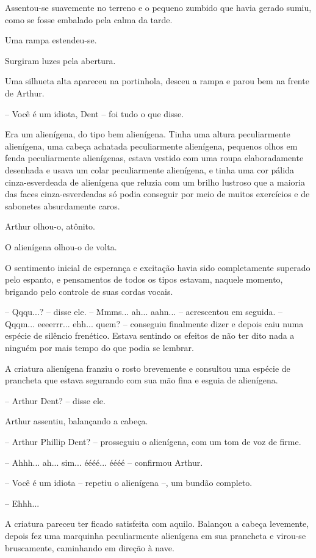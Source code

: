 \documentclass[eps,11pt]{book}
\begin{document}
Assentou-se suavemente no terreno e o pequeno zumbido que havia gerado sumiu, como se fosse embalado pela calma da tarde.

Uma rampa estendeu-se.

Surgiram luzes pela abertura.

Uma silhueta alta apareceu na portinhola, desceu a rampa e parou bem na frente de Arthur.

-- Você é um idiota, Dent -- foi tudo o que disse.

Era um alienígena, do tipo bem alienígena. Tinha uma altura peculiarmente alienígena, uma cabeça achatada peculiarmente alienígena, pequenos olhos em fenda peculiarmente alienígenas, estava vestido com uma roupa elaboradamente desenhada e usava um colar peculiarmente alienígena, e tinha uma cor pálida cinza-esverdeada de alienígena que reluzia com um brilho lustroso que a maioria das faces cinza-esverdeadas só podia conseguir por meio de muitos exercícios e de sabonetes absurdamente caros.

Arthur olhou-o, atônito.

O alienígena olhou-o de volta.

O sentimento inicial de esperança e excitação havia sido completamente superado pelo espanto, e pensamentos de todos os tipos estavam, naquele momento, brigando pelo controle de suas cordas vocais.

-- Qqqu...? -- disse ele. -- Mmms... ah... aahn... -- acrescentou em seguida. -- Qqqm... eeeerrr... ehh... quem? -- conseguiu finalmente dizer e depois caiu numa espécie de silêncio frenético. Estava sentindo os efeitos de não ter dito nada a ninguém por mais tempo do que podia se lembrar.

A criatura alienígena franziu o rosto brevemente e consultou uma espécie de prancheta que estava segurando com sua mão fina e esguia de alienígena.

-- Arthur Dent? -- disse ele.

Arthur assentiu, balançando a cabeça.

-- Arthur Phillip Dent? -- prosseguiu o alienígena, com um tom de voz de firme.

-- Ahhh... ah... sim... éééé... éééé -- confirmou Arthur.

-- Você é um idiota -- repetiu o alienígena --, um bundão completo.

-- Ehhh...

A criatura pareceu ter ficado satisfeita com aquilo. Balançou a cabeça levemente, depois fez uma marquinha peculiarmente alienígena em sua prancheta e virou-se bruscamente, caminhando em direção à nave.
\end{document}
